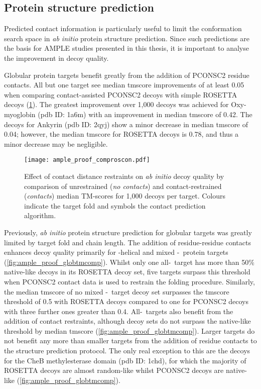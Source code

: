 \subsection{Protein structure prediction}

Predicted contact information is particularly useful to limit the conformation search space in \textit{ab initio} protein structure prediction. Since such predictions are the basis for AMPLE studies presented in this thesis, it is important to analyse the improvement in decoy quality.

Globular protein targets benefit greatly from the addition of PCONSC2 residue contacts. All but one target see median \gls{tmscore} improvements of at least 0.05 when comparing contact-assisted PCONSC2 decoys with simple ROSETTA decoys (\cref{fig:ample_proof_comproscon}). The greatest improvement over 1,000 decoys was achieved for Oxy-myoglobin (\gls{pdb} ID: 1a6m) with an improvement in median \gls{tmscore} of 0.42.  The decoys for Ankyrin (\gls{pdb} ID: 2qyj) show a minor decrease in median \gls{tmscore} of 0.04; however, the median \gls{tmscore} for ROSETTA decoys is 0.78, and thus a minor decrease may be negligible. 

\begin{figure}[H]
    \centering
    \texttt{[image: ample\_proof\_comproscon.pdf]}
    \caption[Effect of contact distance restraints on \textit{ab initio} decoy quality]{Effect of contact distance restraints on \textit{ab initio} decoy quality by comparison of unrestrained (\textit{no contacts}) and contact-restrained (\textit{contacts}) median TM-scores for 1,000 decoys per target. Colours indicate the target fold and symbols the contact prediction algorithm.}
    \label{fig:ample_proof_comproscon}
\end{figure}

Previously, \textit{ab initio} protein structure prediction for globular targets was greatly limited by target fold and chain length. The addition of residue-residue contacts enhances decoy quality primarily for \textalpha-helical and mixed \textalpha-\textbeta\ protein targets (\cref{fig:ample_proof_globtmcomp}). Whilst only one all-\textalpha\ target has more than 50\% native-like decoys in its ROSETTA decoy set, five targets surpass this threshold when PCONSC2 contact data is used to restrain the folding procedure. Similarly, the median \gls{tmscore} of no mixed \textalpha-\textbeta\ target decoy set surpasses the \gls{tmscore} threshold of 0.5 with ROSETTA decoys compared to one for PCONSC2 decoys with three further ones greater than 0.4. All-\textbeta\ targets also benefit from the addition of contact restraints, although decoy sets do not surpass the native-like threshold by median \gls{tmscore} (\cref{fig:ample_proof_globtmcomp}). Larger targets do not benefit any more than smaller targets from the addition of residue contacts to the structure prediction protocol. The only real exception to this are the decoys for the CheB methylesterase domain (\gls{pdb} ID: 1chd), for which the majority of ROSETTA decoys are almost random-like whilst PCONSC2 decoys are native-like (\cref{fig:ample_proof_globtmcomp}).

